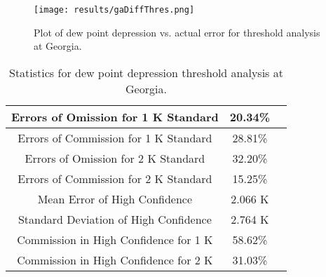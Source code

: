 \documentclass{book}
\begin{document}
\begin{minipage}[c]{0.47\textwidth}
\centering
\begin{figure}[H]
\texttt{[image: results/gaDiffThres.png]}
\caption{Plot of dew point depression vs. actual error for threshold analysis at Georgia.}
\label{fig:gaDiffThres}
\end{figure}
\end{minipage}
\begin{minipage}[c]{0.47\textwidth}
\begin{table}[H]
\centering
\footnotesize
\begin{tabular}{ | c | c | c | } \hline
Errors of Omission for 1 K Standard & 20.34\% \\ \hline
Errors of Commission for 1 K Standard & 28.81\% \\ \hline
Errors of Omission for 2 K Standard & 32.20\% \\ \hline
Errors of Commission for 2 K Standard & 15.25\% \\ \hline
Mean Error of High Confidence & 2.066 K \\ \hline
Standard Deviation of High Confidence & 2.764 K \\ \hline
Commission in High Confidence for 1 K & 58.62\% \\ \hline
Commission in High Confidence for 2 K & 31.03\% \\ \hline
\end{tabular}
\caption{Statistics for dew point depression threshold analysis at Georgia.}
\label{tab:gaDiffThres}
\end{table}
\end{minipage}
\end{document}
